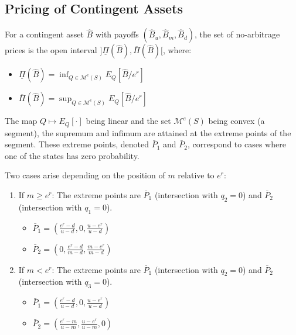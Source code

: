 \subsection{Pricing of Contingent Assets}
For a contingent asset $\hat{B}$ with payoffs $(\hat{B}_u, \hat{B}_m, \hat{B}_d)$, the set of no-arbitrage prices is the open interval $]\underline{\Pi}(\hat{B}), \overline{\Pi}(\hat{B})[$, where:
\begin{itemize}
    \item $\underline{\Pi}(\hat{B}) = \inf_{Q \in \mathcal{M}^e(S)} E_Q[\hat{B}/e^r]$
    \item $\overline{\Pi}(\hat{B}) = \sup_{Q \in \mathcal{M}^e(S)} E_Q[\hat{B}/e^r]$
\end{itemize}
The map $Q \mapsto E_Q[\cdot]$ being linear and the set $\mathcal{M}^e(S)$ being convex (a segment), the supremum and infimum are attained at the extreme points of the segment. These extreme points, denoted $\bar{P}_1$ and $\bar{P}_2$, correspond to cases where one of the states has zero probability.

Two cases arise depending on the position of $m$ relative to $e^r$:
\begin{enumerate}
    \item If $m \ge e^r$: The extreme points are $\bar{P}_1$ (intersection with $q_2=0$) and $\bar{P}_2$ (intersection with $q_1=0$).
        \begin{itemize}
            \item $\bar{P}_1 = (\frac{e^r-d}{u-d}, 0, \frac{u-e^r}{u-d})$
            \item $\bar{P}_2 = (0, \frac{e^r-d}{m-d}, \frac{m-e^r}{m-d})$
        \end{itemize}
    \item If $m < e^r$: The extreme points are $\bar{P}_1$ (intersection with $q_2=0$) and $\bar{P}_2$ (intersection with $q_3=0$).
        \begin{itemize}
            \item $\bar{P}_1 = (\frac{e^r-d}{u-d}, 0, \frac{u-e^r}{u-d})$
            \item $\bar{P}_2 = (\frac{e^r-m}{u-m}, \frac{u-e^r}{u-m}, 0)$
        \end{itemize}
\end{enumerate}

